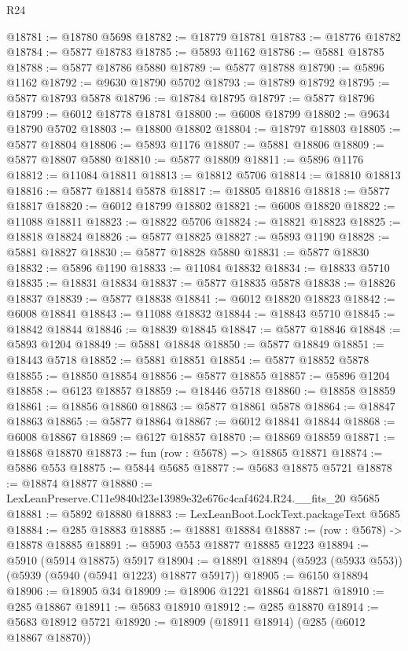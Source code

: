 \begin{lexlean}{R24}
\begin{coremodule}
@18781 := @18780 @5698
@18782 := @18779 @18781
@18783 := @18776 @18782
@18784 := @5877 @18783
@18785 := @5893 @1162
@18786 := @5881 @18785
@18788 := @5877 @18786 @5880
@18789 := @5877 @18788
@18790 := @5896 @1162
@18792 := @9630 @18790 @5702
@18793 := @18789 @18792
@18795 := @5877 @18793 @5878
@18796 := @18784 @18795
@18797 := @5877 @18796
@18799 := @6012 @18778 @18781
@18800 := @6008 @18799
@18802 := @9634 @18790 @5702
@18803 := @18800 @18802
@18804 := @18797 @18803
@18805 := @5877 @18804
@18806 := @5893 @1176
@18807 := @5881 @18806
@18809 := @5877 @18807 @5880
@18810 := @5877 @18809
@18811 := @5896 @1176
@18812 := @11084 @18811
@18813 := @18812 @5706
@18814 := @18810 @18813
@18816 := @5877 @18814 @5878
@18817 := @18805 @18816
@18818 := @5877 @18817
@18820 := @6012 @18799 @18802
@18821 := @6008 @18820
@18822 := @11088 @18811
@18823 := @18822 @5706
@18824 := @18821 @18823
@18825 := @18818 @18824
@18826 := @5877 @18825
@18827 := @5893 @1190
@18828 := @5881 @18827
@18830 := @5877 @18828 @5880
@18831 := @5877 @18830
@18832 := @5896 @1190
@18833 := @11084 @18832
@18834 := @18833 @5710
@18835 := @18831 @18834
@18837 := @5877 @18835 @5878
@18838 := @18826 @18837
@18839 := @5877 @18838
@18841 := @6012 @18820 @18823
@18842 := @6008 @18841
@18843 := @11088 @18832
@18844 := @18843 @5710
@18845 := @18842 @18844
@18846 := @18839 @18845
@18847 := @5877 @18846
@18848 := @5893 @1204
@18849 := @5881 @18848
@18850 := @5877 @18849
@18851 := @18443 @5718
@18852 := @5881 @18851
@18854 := @5877 @18852 @5878
@18855 := @18850 @18854
@18856 := @5877 @18855
@18857 := @5896 @1204
@18858 := @6123 @18857
@18859 := @18446 @5718
@18860 := @18858 @18859
@18861 := @18856 @18860
@18863 := @5877 @18861 @5878
@18864 := @18847 @18863
@18865 := @5877 @18864
@18867 := @6012 @18841 @18844
@18868 := @6008 @18867
@18869 := @6127 @18857
@18870 := @18869 @18859
@18871 := @18868 @18870
@18873 := fun (row : @5678) => @18865 @18871
@18874 := @5886 @553
@18875 := @5844 @5685
@18877 := @5683 @18875 @5721
@18878 := @18874 @18877
@18880 := LexLeanPreserve.C11e9840d23e13989e32e676c4caf4624.R24.__fits_20 @5685
@18881 := @5892 @18880
@18883 := LexLeanBoot.LockText.packageText @5685
@18884 := @285 @18883
@18885 := @18881 @18884
@18887 := (row : @5678) -> @18878 @18885
@18891 := @5903 @553 @18877 @18885 @1223
@18894 := @5910 (@5914 @18875) @5917
@18904 := @18891 @18894 (@5923 (@5933 @553)) (@5939 (@5940 (@5941 @1223) @18877 @5917))
@18905 := @6150 @18894
@18906 := @18905 @34
@18909 := @18906 @1221 @18864 @18871
@18910 := @285 @18867
@18911 := @5683 @18910
@18912 := @285 @18870
@18914 := @5683 @18912 @5721
@18920 := @18909 (@18911 @18914) (@285 (@6012 @18867 @18870))

\end{coremodule}
\end{lexlean}
